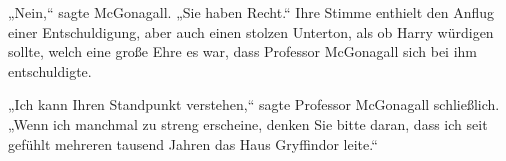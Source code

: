 „Nein,“ sagte McGonagall. „Sie haben Recht.“ Ihre Stimme enthielt den Anflug einer Entschuldigung, aber auch einen stolzen Unterton, als ob Harry würdigen sollte, welch eine große Ehre es war, dass Professor McGonagall sich bei ihm entschuldigte.









„Ich kann Ihren Standpunkt verstehen,“ sagte Professor McGonagall schließlich. „Wenn ich manchmal zu streng erscheine, denken Sie bitte daran, dass ich seit gefühlt mehreren tausend Jahren das Haus Gryffindor leite.“

